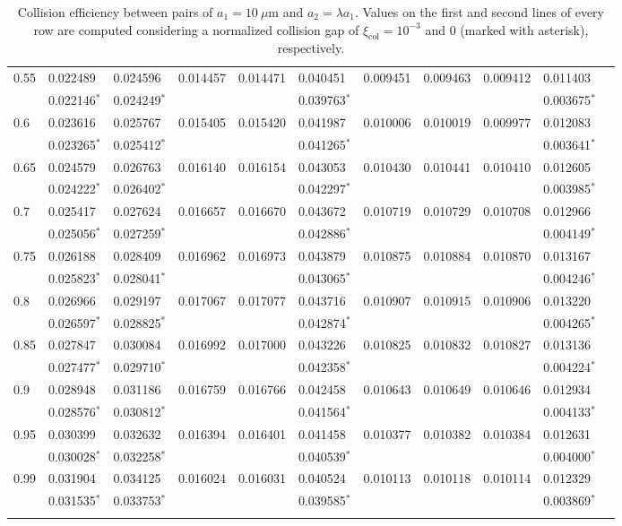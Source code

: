\documentclass[../thesis.tex]{subfiles}
\begin{document}
\begin{landscape}
\begin{longtable}{lllllllllll}
 0.55 & 0.022489 & 0.024596 & 0.014457 & 0.014471 & 0.040451 & 0.009451 & 0.009463 & 0.009412 & 0.011403
 \\
 & 0.022146$^*$ & 0.024249$^*$ & & & 0.039763$^*$ & & & & 0.003675$^*$
 \\
 0.6 & 0.023616 & 0.025767 & 0.015405 & 0.015420 & 0.041987 & 0.010006 & 0.010019 & 0.009977 & 0.012083
 \\
 & 0.023265$^*$ & 0.025412$^*$ & & & 0.041265$^*$ & & & & 0.003641$^*$
 \\
 0.65 & 0.024579 & 0.026763 & 0.016140 & 0.016154 & 0.043053 & 0.010430 & 0.010441 & 0.010410 & 0.012605
 \\
 & 0.024222$^*$ & 0.026402$^*$ & & & 0.042297$^*$ & & & & 0.003985$^*$
 \\
 0.7 & 0.025417 & 0.027624 & 0.016657 & 0.016670 & 0.043672 & 0.010719 & 0.010729 & 0.010708 & 0.012966
 \\
 & 0.025056$^*$ & 0.027259$^*$ & & & 0.042886$^*$ & & & & 0.004149$^*$
 \\
 0.75 & 0.026188 & 0.028409 & 0.016962 & 0.016973 & 0.043879 & 0.010875 & 0.010884 & 0.010870 & 0.013167
 \\
 & 0.025823$^*$ & 0.028041$^*$ & & & 0.043065$^*$ & & & & 0.004246$^*$
 \\
 0.8 & 0.026966 & 0.029197 & 0.017067 & 0.017077 & 0.043716 & 0.010907 & 0.010915 & 0.010906 & 0.013220
 \\
 & 0.026597$^*$ & 0.028825$^*$ & & & 0.042874$^*$ & & & & 0.004265$^*$
 \\
 0.85 & 0.027847 & 0.030084 & 0.016992 & 0.017000 & 0.043226 & 0.010825 & 0.010832 & 0.010827 & 0.013136
 \\
 & 0.027477$^*$ & 0.029710$^*$ & & & 0.042358$^*$ & & & & 0.004224$^*$
 \\
 0.9 & 0.028948 & 0.031186 & 0.016759 & 0.016766 & 0.042458 & 0.010643 & 0.010649 & 0.010646 & 0.012934
 \\
 & 0.028576$^*$ & 0.030812$^*$ & & & 0.041564$^*$ & & & & 0.004133$^*$
 \\
 0.95 & 0.030399 & 0.032632 & 0.016394 & 0.016401 & 0.041458 & 0.010377 & 0.010382 & 0.010384 & 0.012631
 \\
 & 0.030028$^*$ & 0.032258$^*$ & & & 0.040539$^*$ & & & & 0.004000$^*$
 \\
 0.99 & 0.031904 & 0.034125 & 0.016024 & 0.016031 & 0.040524 & 0.010113 & 0.010118 & 0.010114 & 0.012329
 \\
 & 0.031535$^*$ & 0.033753$^*$ & & & 0.039585$^*$ & & & & 0.003869$^*$
 \\ \hline
 \caption{Collision efficiency between pairs of $a_1=10~\mu$m and $a_2=\lambda a_1$. Values on the first and second lines of every row are computed considering a normalized collision gap of $\xi_\text{col}=10^{-3}$ and $0$ (marked with asterisk), respectively.}
\label{tab:E10}
\end{longtable}%


\end{landscape}
\end{document}
